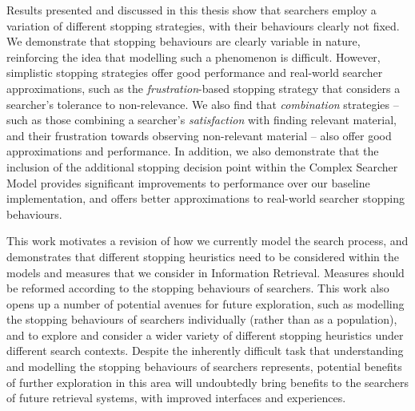 \begin{preamble}
Results presented and discussed in this thesis show that searchers employ a variation of different stopping strategies, with their behaviours clearly not fixed. We demonstrate that stopping behaviours are clearly variable in nature, reinforcing the idea that modelling such a phenomenon is difficult. However, simplistic stopping strategies offer good performance and real-world searcher approximations, such as the \emph{frustration}-based stopping strategy that considers a searcher's tolerance to non-relevance. We also find that \emph{combination} strategies -- such as those combining a searcher's \emph{satisfaction} with finding relevant material, and their frustration towards observing non-relevant material -- also offer good approximations and performance. In addition, we also demonstrate that the inclusion of the additional stopping decision point within the Complex Searcher Model provides significant improvements to performance over our baseline implementation, and offers better approximations to real-world searcher stopping behaviours.

This work motivates a revision of how we currently model the search process, and demonstrates that different stopping heuristics need to be considered within the models and measures that we consider in Information Retrieval. Measures should be reformed according to the stopping behaviours of searchers. This work also opens up a number of potential avenues for future exploration, such as modelling the stopping behaviours of searchers individually (rather than as a population), and to explore and consider a wider variety of different stopping heuristics under different search contexts. Despite the inherently difficult task that understanding and modelling the stopping behaviours of searchers represents, potential benefits of further exploration in this area will undoubtedly bring benefits to the searchers of future retrieval systems, with improved interfaces and experiences.

\end{preamble}